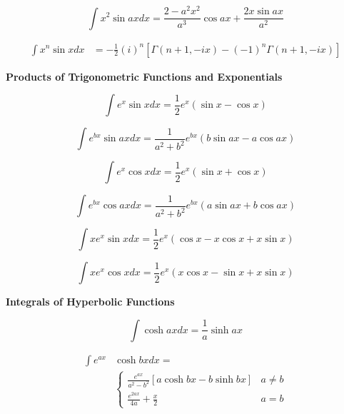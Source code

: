 \documentclass[11pt,twoside]{article}
\begin{document}
\begin{multicols}{3}
\begin{footnotesize}
\begin{equation}
\int x^2 \sin ax dx =\frac{2-a^2x^2}{a^3}\cos ax +\frac{ 2 x \sin ax}{a^2} 
\end{equation}

\begin{align}
\int x^n \sin x dx &= -\frac{1}{2}(i)^n\left[ \Gamma(n+1, -ix) 
 - (-1)^n\Gamma(n+1, -ix)\right] 
\end{align}

 
\begin{center} \textbf{Products of Trigonometric Functions and Exponentials} \end{center}

\begin{equation}
\int e^x \sin x dx = \frac{1}{2}e^x (\sin x - \cos x) 
\end{equation}

\begin{equation}
\int e^{bx} \sin ax dx = \frac{1}{a^2+b^2}e^{bx} (b\sin ax - a\cos ax) 
\end{equation}

\begin{equation}
\int e^x \cos x dx = \frac{1}{2}e^x (\sin x + \cos x)  
\end{equation}

\begin{equation}
\int e^{bx} \cos ax dx = \frac{1}{a^2 + b^2} e^{bx} ( a \sin ax + b \cos ax ) 
\end{equation}

\begin{equation}
\int x e^x \sin x dx = \frac{1}{2}e^x (\cos x - x \cos x + x \sin x) 
\end{equation}

\begin{equation}
\int x e^x \cos x dx = \frac{1}{2}e^x (x \cos x 
- \sin x + x \sin x) 
\end{equation}

\begin{center} \textbf{Integrals of Hyperbolic Functions} \end{center}

\begin{equation}
\int \cosh ax dx =\frac{1}{a} \sinh ax 
\end{equation}

\begin{align}
\int e^{ax} & \cosh bx dx = \nonumber \\ &
\begin{cases}
\displaystyle{\frac{e^{ax}}{a^2-b^2} }[ a \cosh bx - b \sinh bx ]  & a\ne b \\
\displaystyle{\frac{e^{2ax}}{4a} + \frac{x}{2}}  & a = b
\end{cases}
\end{align}


\end{footnotesize}
\end{multicols}
\end{document}
